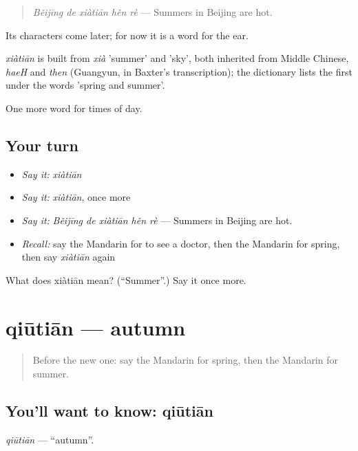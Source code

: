 \begin{quote}
\emph{Běijīng de xiàtiān hěn rè} — Summers in Beijing are hot.
\end{quote}

Its characters come later; for now it is a word for the ear.

\begin{cousinweb}
\emph{xiàtiān} is built from \emph{xià} 'summer' and  'sky', both inherited from Middle Chinese, \emph{haeH} and \emph{then} (Guangyun, in Baxter's transcription); the dictionary lists the first under the words 'spring and summer'.
\end{cousinweb}

\begin{grammarlens}[title={What you've built}]
One more word for times of day.
\end{grammarlens}

\subsection*{Your turn}
\begin{itemize}
\raggedright
  \item \emph{Say it:} \emph{xiàtiān}
  \item \emph{Say it:} \emph{xiàtiān}, once more
  \item \emph{Say it:} \emph{Běijīng de xiàtiān hěn rè} — Summers in Beijing are hot.
  \item \emph{Recall:} say the Mandarin for to see a doctor, then the Mandarin for spring, then say \emph{xiàtiān} again
\end{itemize}

\begin{tcolorbox}[breakable,colback=teal!4,colframe=teal!35!black,title={Before you move on}]
What does xiàtiān mean? (\textquotedblleft{}Summer\textquotedblright{}.) Say it once more.
\end{tcolorbox}
\section[qiūtiān]{qiūtiān — autumn}

\label{lesson:ZH-C131-qiutian}



\begin{quote}
Before the new one: say the Mandarin for spring, then the Mandarin for summer.
\end{quote}

\subsection*{You'll want to know: qiūtiān}
\emph{qiūtiān} — \textquotedblleft{}autumn\textquotedblright{}.

